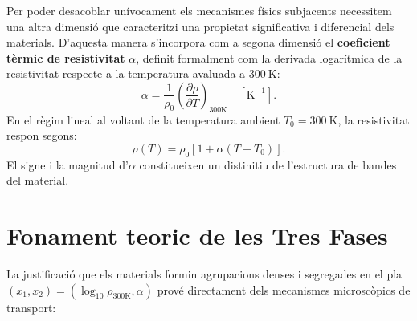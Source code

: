 \documentclass[a4paper,11pt]{article}
\begin{document}
Per poder desacoblar unívocament els mecanismes físics subjacents necessitem una altra dimensió que caracteritzi una propietat significativa i diferencial dels materials. D'aquesta manera s'incorpora com a segona dimensió el \textbf{coeficient tèrmic de resistivitat} $\alpha$, definit formalment com la derivada logarítmica de la resistivitat respecte a la temperatura avaluada a $300\ \text{K}$:
\begin{equation}
    \alpha = \frac{1}{\rho_0} \left(\frac{\partial \rho}{\partial T}\right)_{300\mathrm{K}} \quad [\text{K}^{-1}].
    \label{eq:alpha}
\end{equation}
En el règim lineal al voltant de la temperatura ambient $T_0 = 300\ \text{K}$, la resistivitat respon segons:
\begin{equation}
    \rho(T) = \rho_0 \left[1 + \alpha(T - T_0)\right].
    \label{eq:rho_temp}
\end{equation}
El signe i la magnitud d'$\alpha$ constitueixen un distinitiu de l'estructura de bandes del material.

\section{Fonament teoric de les Tres Fases}

La justificació que els materials formin agrupacions denses i segregades en el pla $(x_1, x_2) = (\log_{10}\rho_{300\mathrm{K}}, \alpha)$ prové directament dels mecanismes microscòpics de transport:
\end{document}
